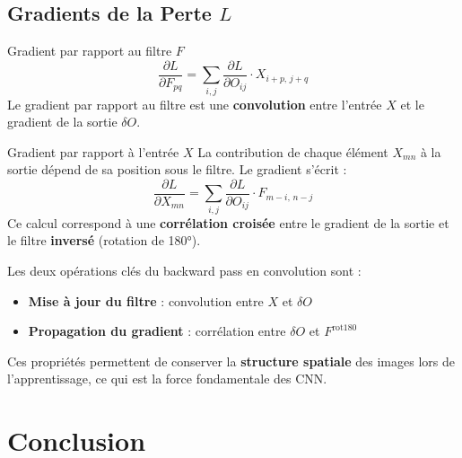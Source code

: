 \documentclass[12pt, a4paper]{article}
\begin{document}
\subsection{Gradients de la Perte $L$}

\begin{stepbox}{Gradient par rapport au filtre $F$}
\begin{equation}
    \frac{\partial L}{\partial F_{pq}}
    = \sum_{i,j} \frac{\partial L}{\partial O_{ij}} \cdot X_{i+p,\,j+q}
    \label{eq:grad_F}
\end{equation}
Le gradient par rapport au filtre est une \textbf{convolution} entre l'entrée $X$
et le gradient de la sortie $\delta O$.
\end{stepbox}

\vspace{0.4cm}

\begin{stepbox}{Gradient par rapport à l'entrée $X$}
La contribution de chaque élément $X_{mn}$ à la sortie dépend de sa position
sous le filtre. Le gradient s'écrit :
\begin{equation}
    \frac{\partial L}{\partial X_{mn}}
    = \sum_{i,j} \frac{\partial L}{\partial O_{ij}} \cdot F_{m-i,\,n-j}
    \label{eq:grad_X}
\end{equation}
Ce calcul correspond à une \textbf{corrélation croisée} entre le gradient de la
sortie et le filtre \textbf{inversé} (rotation de 180°).
\end{stepbox}

\begin{infobox}[title={Propriété fondamentale de la rétropropagation en CNN}]
Les deux opérations clés du backward pass en convolution sont :
\begin{itemize}[noitemsep]
    \item \textbf{Mise à jour du filtre} : convolution entre $X$ et $\delta O$
    \item \textbf{Propagation du gradient} : corrélation entre $\delta O$ et $F^{\text{rot180}}$
\end{itemize}
Ces propriétés permettent de conserver la \textbf{structure spatiale} des images
lors de l'apprentissage, ce qui est la force fondamentale des CNN.
\end{infobox}

\section*{Conclusion}
\end{document}
